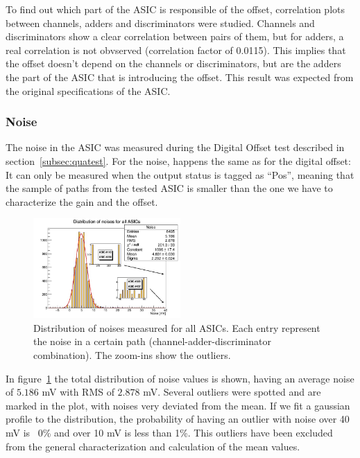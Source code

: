 \documentclass[a4paper,10pt]{book}
\begin{document}
To find out which part of the ASIC is responsible of the offset, correlation plots between channels, adders and discriminators were studied. Channels and discriminators show a clear correlation between pairs of them,
but for adders, a real correlation is not obvserved (correlation factor of 0.0115). This implies that the offset doesn't depend on the channels or discriminators, but are the adders the part of the ASIC that is introducing the offset. This
result was expected from the original specifications of the ASIC. 

\subsubsection{Noise}

The noise in the ASIC was measured during the Digital Offset test described in section~\ref{subsec:quatest}. For the noise, happens the same as for the digital offset: It can only be measured when the output
status is tagged as ``Pos'', meaning that the sample of paths from the tested ASIC is smaller than the one we have to characterize the gain and the offset. \\

\begin{figure}
\centering
 \includegraphics[width=0.5\textwidth]{./noisedist.jpg}
  \caption{Distribution of noises measured for all ASICs. Each entry represent the noise in a certain path (channel-adder-discriminator combination). The zoom-ins show the outliers.}
    \label{fig:noisedist}
\end{figure}

In figure~\ref{fig:noisedist} the total distribution of noise values is shown, having an average noise of $5.186$ mV with RMS of $2.878$ mV. Several outliers were spotted and are marked in the plot, with noises very
deviated from the mean. If we fit a gaussian profile to the distribution, the probability of having an outlier with noise over 40 mV is ~0\% and over 10 mV is less than 1\%. This outliers have been excluded
from the general characterization and calculation of the mean values.\\
\end{document}
